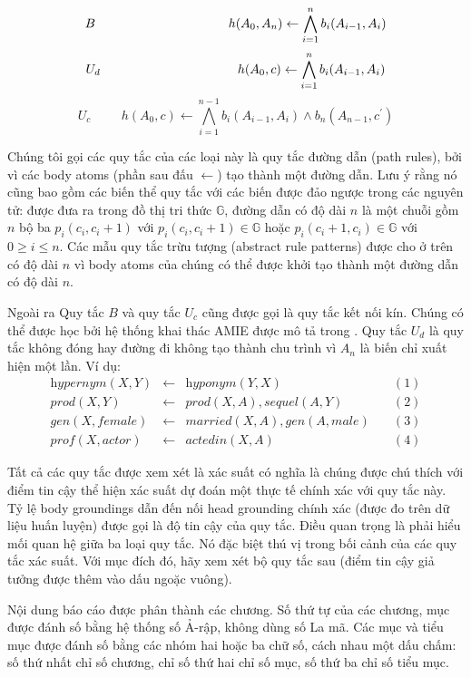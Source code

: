 \[B \hspace{3.7cm} h(A_0,A_n) \gets  \bigwedge^n_{i=1} b_i(A_{i-1}, A_i)\]
\[U_d \hspace{3.8cm} h(A_0,c) \gets  \bigwedge^n_{i=1} b_i(A_{i-1}, A_i)\]
\[U_c \hspace{1cm} h(A_0,c) \gets  \bigwedge^{n-1}_{i=1} b_i(A_{i-1}, A_i) \wedge b_n(A_{n-1}, c^{\prime})\]

Chúng tôi gọi các quy tắc của các loại này là quy tắc đường dẫn (path rules), bởi vì các body atoms (phần sau đấu \(\gets\)) tạo thành một đường dẫn. Lưu ý rằng nó cũng bao gồm các biến thể quy tắc với các biến được đảo ngược trong các nguyên tử: được đưa ra trong đồ thị tri thức \(\mathbb{G}\), đường dẫn có độ dài \(n\) là một chuỗi gồm \(n\) bộ ba \(p_i (c_i, c_i + 1)\) với \(p_i (c_i, c_i + 1) \in \mathbb{G}\) hoặc \(p_i (c_i + 1, c_i) \in \mathbb{G}\) với \(0 \geq i \leq n\). Các mẫu quy tắc trừu tượng (abstract rule patterns) được cho ở trên có độ dài \(n\) vì body atoms của chúng có thể được khởi tạo thành một đường dẫn có độ dài \(n\).

Ngoài ra Quy tắc \(B\) và quy tắc \(U_c\) cũng được gọi là quy tắc kết nối kín. Chúng có thể được học bởi hệ thống khai thác AMIE được mô tả trong \cite{AMIE,galarraga2015fast}. Quy tắc \(U_d\) là quy tắc không đóng hay đường đi không tạo thành chu trình vì \(A_n\) là biến chỉ xuất hiện một lần. Ví dụ:
\[
\begin{matrix}
\textit{hypernym}(X, Y ) & \gets & \textit{hyponym}(Y, X) & \quad (1) \\
prod(X, Y ) & \gets & prod(X, A),sequel(A, Y )  & \quad  (2) \\
gen(X, female) & \gets & married(X, A), gen(A, male)  & \quad  (3) \\
prof(X, actor) &  \gets & actedin(X, A)  & \quad (4)
\end{matrix}
\]

Tất cả các quy tắc được xem xét là xác suất có nghĩa là chúng được chú thích với điểm tin cậy thể hiện xác suất dự đoán một thực tế chính xác với quy tắc này. Tỷ lệ body groundings dẫn đến nối head grounding chính xác (được đo trên dữ liệu huấn luyện) được gọi là độ tin cậy của quy tắc. Điều quan trọng là phải hiểu mối quan hệ giữa ba loại quy tắc. Nó đặc biệt thú vị trong bối cảnh của các quy tắc xác suất. Với mục đích đó, hãy xem xét bộ quy tắc sau (điểm tin cậy giả tưởng được thêm vào dấu ngoặc vuông).

Nội dung báo cáo được phân thành các chương. Số thứ tự của các chương, mục được đánh số bằng hệ thống số Ả-rập, không dùng số La mã. Các mục và tiểu mục được đánh số bằng các nhóm hai hoặc ba chữ số, cách nhau một dấu chấm: số thứ nhất chỉ số chương, chỉ số thứ hai chỉ số mục, số thứ ba chỉ số tiểu mục.


